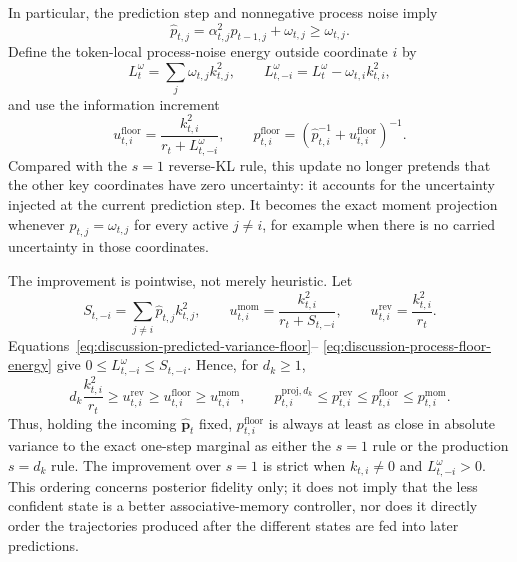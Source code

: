 \documentclass[11pt]{article}
\newcommand{\vct}[1]{\boldsymbol{#1}}
\begin{document}
In particular, the prediction step and nonnegative process noise imply
\begin{equation}
  \widehat p_{t,j}
  =\alpha_{t,j}^2p_{t-1,j}+\omega_{t,j}
  \geq \omega_{t,j}.
  \label{eq:discussion-predicted-variance-floor}
\end{equation}
Define the token-local process-noise energy outside coordinate $i$ by
\begin{equation}
  L_t^{\omega}=\sum_j\omega_{t,j}k_{t,j}^2,
  \qquad
  L_{t,-i}^{\omega}=L_t^{\omega}-\omega_{t,i}k_{t,i}^2,
  \label{eq:discussion-process-floor-energy}
\end{equation}
and use the information increment
\begin{equation}
  u_{t,i}^{\mathrm{floor}}
  =\frac{k_{t,i}^2}{r_t+L_{t,-i}^{\omega}},
  \qquad
  p_{t,i}^{\mathrm{floor}}
  =\left(\widehat p_{t,i}^{-1}+u_{t,i}^{\mathrm{floor}}\right)^{-1}.
  \label{eq:discussion-process-floor-update}
\end{equation}
Compared with the $s=1$ reverse-KL rule, this update no longer pretends that the other key
coordinates have zero uncertainty: it accounts for the uncertainty injected at the current
prediction step. It becomes the exact moment projection whenever
$\widehat p_{t,j}=\omega_{t,j}$ for every active $j\ne i$, for example when there is no carried
uncertainty in those coordinates.

The improvement is pointwise, not merely heuristic. Let
\begin{equation}
  S_{t,-i}=\sum_{j\ne i}\widehat p_{t,j}k_{t,j}^2,
  \qquad
  u_{t,i}^{\mathrm{mom}}=\frac{k_{t,i}^2}{r_t+S_{t,-i}},
  \qquad
  u_{t,i}^{\mathrm{rev}}=\frac{k_{t,i}^2}{r_t}.
  \label{eq:discussion-floor-comparison-increments}
\end{equation}
Equations~\eqref{eq:discussion-predicted-variance-floor}--
\eqref{eq:discussion-process-floor-energy} give
$0\leq L_{t,-i}^{\omega}\leq S_{t,-i}$. Hence, for $d_k\geq1$,
\begin{equation}
  d_k\frac{k_{t,i}^2}{r_t}
  \geq u_{t,i}^{\mathrm{rev}}
  \geq u_{t,i}^{\mathrm{floor}}
  \geq u_{t,i}^{\mathrm{mom}},
  \qquad
  p_{t,i}^{\mathrm{proj},d_k}
  \leq p_{t,i}^{\mathrm{rev}}
  \leq p_{t,i}^{\mathrm{floor}}
  \leq p_{t,i}^{\mathrm{mom}}.
  \label{eq:discussion-floor-ordering}
\end{equation}
Thus, holding the incoming $\widehat{\vct{p}}_t$ fixed,
$p_{t,i}^{\mathrm{floor}}$ is always at least as close in absolute variance to the exact one-step
marginal as either the $s=1$ rule or the production $s=d_k$ rule. The improvement over $s=1$ is
strict when $k_{t,i}\ne0$ and
$L_{t,-i}^{\omega}>0$. This ordering concerns posterior fidelity only; it does not imply that the
less confident state is a better associative-memory controller, nor does it directly order the
trajectories produced after the different states are fed into later predictions.
\end{document}
